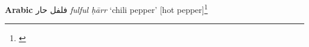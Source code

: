 \begin{etymology}\label{ety:fulful harr}
\textbf{Arabic} {فلفل حار } \textit{fulful ḥārr} `chili pepper' [hot pepper]\footnote{\textcite{wehr_dictionary_1976}}
\end{etymology}
